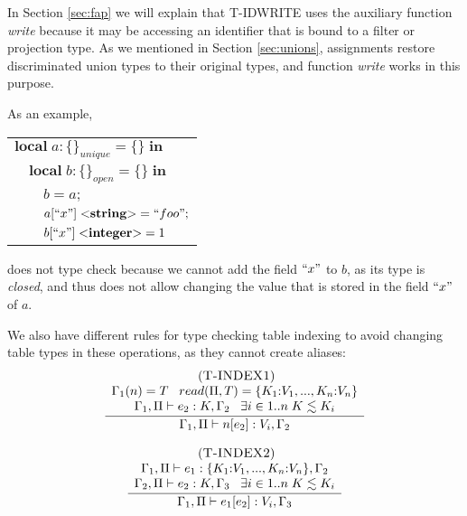 In Section \ref{sec:fap} we will explain that \textsc{T-IDWRITE} uses
the auxiliary function \emph{write} because it may be accessing an
identifier that is bound to a filter or projection type.
As we mentioned in Section \ref{sec:unions}, assignments restore
discriminated union types to their original types, and
function \emph{write} works in this purpose.

As an example,
\begin{center}
\begin{tabular}{lll}
\multicolumn{3}{l}{$\mathbf{local} \; a:\{\}_{unique} = \{\} \; \mathbf{in}$}\\
& \multicolumn{2}{l}{$\mathbf{local} \; b:\{\}_{open} = \{\} \; \mathbf{in}$}\\
& & \multicolumn{1}{l}{$b = a;$}\\
& & \multicolumn{1}{l}{$a[``x"] \; {<}\mathbf{string}{>} = ``foo";$}\\
& & \multicolumn{1}{l}{$b[``x"] \; {<}\mathbf{integer}{>} = 1$}\\
\end{tabular}
\end{center}
does not type check because we cannot add the field $``x"$ to $b$,
as its type is \emph{closed}, and thus does not allow changing the
value that is stored in the field $``x"$ of $a$.

We also have different rules for type checking table indexing to avoid
changing table types in these operations, as they cannot create aliases:
\[
\begin{array}{c}
\begin{array}{c}
\; (\textsc{T-INDEX1})\\
\dfrac{\begin{array}{c}
       \Gamma_{1}(n) = T \;\;\;
       read(\Pi, T) = \{K_{1}{:}V_{1}, ..., K_{n}{:}V_{n}\}\\
       \Gamma_{1}, \Pi \vdash e_{2}:K, \Gamma_{2} \;\;\;
       \exists i \in 1{..}n \; K \lesssim K_{i}
       \end{array}}
      {\Gamma_{1}, \Pi \vdash n[e_{2}]:V_{i}, \Gamma_{2}}
\end{array}
\\ \\
\begin{array}{c}
\; (\textsc{T-INDEX2})\\
\dfrac{\begin{array}{c}
       \Gamma_{1}, \Pi \vdash e_{1}:\{K_{1}{:}V_{1}, ..., K_{n}{:}V_{n}\}, \Gamma_{2}\\
       \Gamma_{2}, \Pi \vdash e_{2}:K, \Gamma_{3} \;\;\;
       \exists i \in 1{..}n \; K \lesssim K_{i}
       \end{array}}
      {\Gamma_{1}, \Pi \vdash e_{1}[e_{2}]:V_{i}, \Gamma_{3}}
\end{array}
\end{array}
\]

